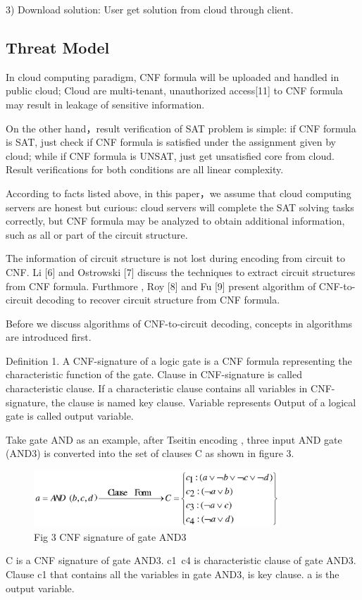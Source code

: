 \documentclass[runningheads,a4paper]{llncs}
\begin{document}
3)  Download solution: User get solution from cloud through client.{}
\subsection{Threat Model}

In cloud computing paradigm, CNF formula will be uploaded and handled in public cloud; Cloud are multi-tenant, unauthorized access[11] to CNF formula may result in leakage of sensitive information.

On the other hand，result verification of SAT problem is simple: if CNF formula is SAT, just check if CNF formula is satisfied under the assignment given by cloud; while if CNF formula is UNSAT, just get unsatisfied core from cloud. Result verifications for both conditions are all linear complexity.

According to facts listed above, in this paper，we assume that cloud computing servers are honest but curious: cloud servers will complete the SAT solving tasks correctly, but CNF formula may be analyzed to obtain additional information, such as all or part of the circuit structure.

The information of circuit structure is not lost during encoding from circuit to CNF. Li [6] and Ostrowski [7] discuss the techniques to extract circuit structures from CNF formula. Furthmore , Roy [8] and Fu [9]  present algorithm of CNF-to-circuit decoding to recover circuit structure from CNF formula.

Before we discuss algorithms of CNF-to-circuit decoding, concepts in algorithms are introduced first.  

\noindent Definition 1. A CNF-signature of a logic gate is a CNF formula representing the characteristic function of the gate. Clause in CNF-signature is called characteristic clause. If a characteristic clause contains all variables in CNF-signature, the clause is named key clause. Variable represents Output of a logical gate is called output variable.

Take gate AND as an example, after Tseitin encoding , three input AND gate (AND3) is converted into the set of clauses C as shown in figure 3.
\begin{figure}
\centering
\includegraphics[width=9.2cm]{a3}
\caption{Fig 3 CNF signature of gate AND3 }
\end{figure}
C is a CNF signature of gate AND3. c1~c4 is characteristic clause of gate AND3. Clause c1 that contains all the variables in gate AND3, is key clause. a is the output variable.
\end{document}
